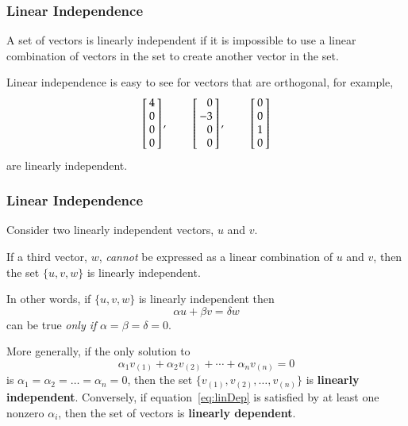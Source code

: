 \documentclass[10pt]{beamer}
\begin{document}
\begin{frame}
\frametitle{Linear Independence}

A set of vectors is linearly independent if it is impossible to use a
linear combination of vectors in the set to create another vector in the set.

Linear independence is easy to see for vectors that are orthogonal,
for example,
\begin{equation*}
    \left[
        \negthickspace\begin{array}{r}4 \\ 0 \\  0\\ 0\end{array}\negthickspace
    \right],
    \ \ \ \ \ \ \ \ \
    \left[
        \negthickspace\begin{array}{r}0 \\ -3 \\  0\\ 0\end{array}\negthickspace
    \right],
    \ \ \ \ \ \ \ \ \
    \left[
        \negthickspace\begin{array}{r}0 \\ 0 \\  1\\ 0\end{array}\negthickspace
    \right]
\end{equation*}
are linearly independent.

\end{frame}
\begin{frame}
\frametitle{Linear Independence}

Consider two linearly independent vectors, $u$ and $v$.

If a third vector, $w$, \emph{cannot} be expressed as a linear
combination of $u$ and $v$, then the set $\{u,v,w\}$ is
linearly independent.

In other words, if $\{u,v,w\}$ is linearly independent then
\begin{equation*}
    \alpha u + \beta v = \delta w
\end{equation*}
can be true \emph{only if} $\alpha = \beta = \delta = 0$.


More generally, if the only solution to
\begin{equation}    \label{eq:linDep}
    \alpha_1 v_{(1)} + \alpha_2 v_{(2)} + \cdots + \alpha_n v_{(n)} = 0
\end{equation}
is $\alpha_1 = \alpha_2 = \ldots = \alpha_n = 0$, then the set
$\{v_{(1)},v_{(2)},\ldots,v_{(n)}\}$
is \textbf{linearly independent}.
Conversely, if equation~\eqref{eq:linDep} is satisfied by at least
one nonzero $\alpha_i$, then the set of vectors is \textbf{linearly dependent}.

\end{frame}
\end{document}

